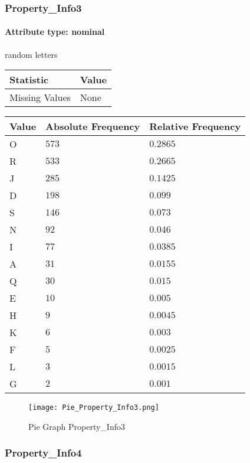 \subsubsection{Property\_Info3}
\paragraph{Attribute type: nominal} random letters

\begin{table}[H]
	\renewcommand{\arraystretch}{1.25}
	\begin{tabular}{l|l}
		\textbf{Statistic} & \textbf{Value}\\\hline
		Missing Values& None\\\hline
	\end{tabular}
\end{table}
\begin{table}[H]
	\renewcommand{\arraystretch}{1.25}
	\begin{tabular}{l|l|l}
		\textbf{Value} & \textbf{Absolute Frequency} & \textbf{Relative Frequency}\\\hline
		O&$573$&$0.2865$\\\hline
		R&$533$&$0.2665$\\\hline
		J&$285$&$0.1425$\\\hline
		D&$198$&$0.099$\\\hline
		S&$146$&$0.073$\\\hline
		N&$92$&$0.046$\\\hline
		I&$77$&$0.0385$\\\hline
		A&$31$&$0.0155$\\\hline
		Q&$30$&$0.015$\\\hline
		E&$10$&$0.005$\\\hline
		H&$9$&$0.0045$\\\hline
		K&$6$&$0.003$\\\hline
		F&$5$&$0.0025$\\\hline
		L&$3$&$0.0015$\\\hline
		G&$2$&$0.001$
	\end{tabular}
\end{table}
\begin{figure}[H]
	\begin{center}
		\texttt{[image: Pie\_Property\_Info3.png]}
	\end{center}
	\caption{Pie Graph Property\_Info3}
\end{figure}

\subsubsection{Property\_Info4}
